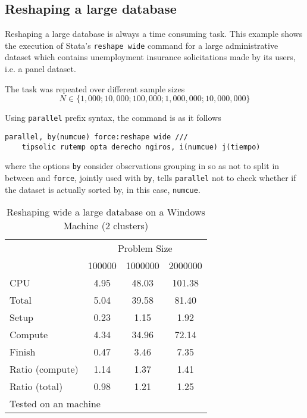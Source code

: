 \documentclass[letterpaper, 10pt]{article}
\begin{document}
\pagebreak

\subsection{Reshaping a large database}

Reshaping a large database is always a time consuming task. This example shows the execution of Stata's {\tt reshape wide} command for a large administrative dataset which contains unemployment insurance solicitations made by its users, i.e. a panel dataset.

The task was repeated over different sample sizes 
\begin{equation*}N \in \{1,000; 10,000; 100,000; 1,000,000; 10,000,000\}\end{equation*}

Using {\tt parallel} prefix syntax, the command is as it follows

\begin{Verbatim}[tabsize=4, fontsize=\footnotesize]
parallel, by(numcue) force:reshape wide ///
    tipsolic rutemp opta derecho ngiros, i(numcue) j(tiempo)
\end{Verbatim}

\noindent where the options {\tt by} consider observations grouping in so as not to split in between and {\tt force}, jointly used with {\tt by}, tells {\tt parallel} not to check whether if the dataset is actually sorted by, in this case, {\tt numcue}.

\begin{table}[!h]
\centering
\caption{Reshaping wide a large database on a Windows Machine (2 clusters)}
\begin{tabular}{l*{3}{c}}\hline
& \multicolumn{3}{c}{Problem Size} \\
& 100000 &         1000000 &         2000000 \\ \hline
CPU &     4.95 &     48.03 &    101.38 \\
Total &     5.04 &     39.58 &     81.40 \\
\hspace{2mm} Setup &     0.23 &      1.15 &      1.92 \\
\hspace{2mm} Compute &     4.34 &     34.96 &     72.14 \\
\hspace{2mm} Finish &     0.47 &      3.46 &      7.35 \\
\hline Ratio (compute) &     1.14 &      1.37 &      1.41 \\
Ratio (total) &     0.98 &      1.21 &      1.25 \\
\hline
\multicolumn{4}{l}{\footnotesize Tested on an \win1 machine}
\end{tabular}
\end{table}
\end{document}
